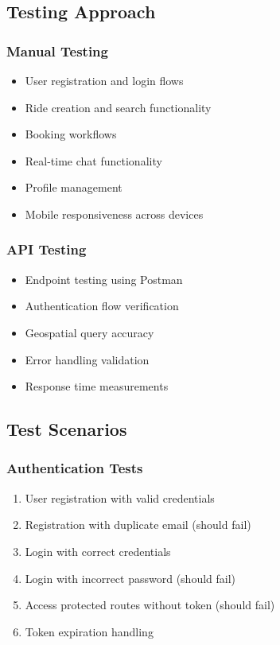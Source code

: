 \documentclass[12pt,a4paper]{article}
\begin{document}
\subsection{Testing Approach}

\subsubsection{Manual Testing}
\begin{itemize}
    \item User registration and login flows
    \item Ride creation and search functionality
    \item Booking workflows
    \item Real-time chat functionality
    \item Profile management
    \item Mobile responsiveness across devices
\end{itemize}

\subsubsection{API Testing}
\begin{itemize}
    \item Endpoint testing using Postman
    \item Authentication flow verification
    \item Geospatial query accuracy
    \item Error handling validation
    \item Response time measurements
\end{itemize}

\subsection{Test Scenarios}

\subsubsection{Authentication Tests}
\begin{enumerate}
    \item User registration with valid credentials
    \item Registration with duplicate email (should fail)
    \item Login with correct credentials
    \item Login with incorrect password (should fail)
    \item Access protected routes without token (should fail)
    \item Token expiration handling
\end{enumerate}
\end{document}
